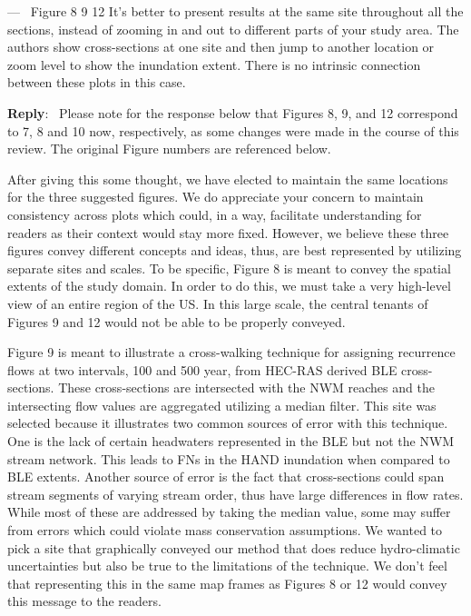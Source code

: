 \documentclass[11pt]{article}
\newcounter{reviewer}
\newcounter{point}[reviewer]
\renewcommand{\thepoint}{P\,\thereviewer.\arabic{point}}
\newenvironment{point}
   {\refstepcounter{point} \bigskip \noindent {\textbf{Reviewer~Point~\thepoint} } ---\ }
   {\par }
\newenvironment{reply}
   {\medskip \noindent \begin{sf}\textbf{Reply}:\  }
   {\medskip \end{sf}}
\begin{document}
\begin{point}
Figure 8 9 12 It's better to present results at the same site throughout all the sections, instead of zooming in and out to different parts of your study area.
The authors show cross-sections at one site and then jump to another location or zoom level to show the inundation extent.
There is no intrinsic connection between these plots in this case. 
\end{point}

\begin{reply}
Please note for the response below that Figures 8, 9, and 12 correspond to 7, 8 and 10 now, respectively, as some changes were made in the course of this review.
The original Figure numbers are referenced below.

After giving this some thought, we have elected to maintain the same locations for the three suggested figures.
We do appreciate your concern to maintain consistency across plots which could, in a way, facilitate understanding for readers as their context would stay more fixed.
However, we believe these three figures convey different concepts and ideas, thus, are best represented by utilizing separate sites and scales.
To be specific, Figure 8 is meant to convey the spatial extents of the study domain. 
In order to do this, we must take a very high-level view of an entire region of the US.
In this large scale, the central tenants of Figures 9 and 12 would not be able to be properly conveyed.

Figure 9 is meant to illustrate a cross-walking technique for assigning recurrence flows at two intervals, 100 and 500 year, from HEC-RAS derived BLE cross-sections.
These cross-sections are intersected with the NWM reaches and the intersecting flow values are aggregated utilizing a median filter.
This site was selected because it illustrates two common sources of error with this technique.
One is the lack of certain headwaters represented in the BLE but not the NWM stream network.
This leads to FNs in the HAND inundation when compared to BLE extents.
Another source of error is the fact that cross-sections could span stream segments of varying stream order, thus have large differences in flow rates.
While most of these are addressed by taking the median value, some may suffer from errors which could violate mass conservation assumptions.
We wanted to pick a site that graphically conveyed our method that does reduce hydro-climatic uncertainties but also be true to the limitations of the technique.
We don't feel that representing this in the same map frames as Figures 8 or 12 would convey this message to the readers.


\end{reply}
\end{document}
